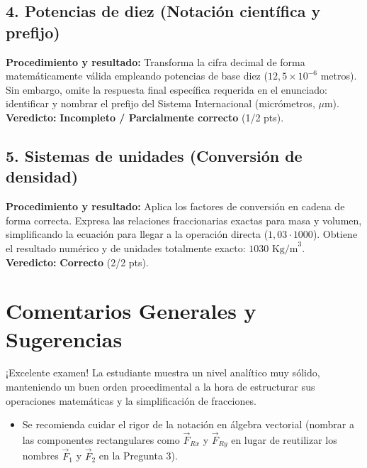 \documentclass[12pt]{article}
\begin{document}
\subsection*{4. Potencias de diez (Notación científica y prefijo)}
\textbf{Procedimiento y resultado:} Transforma la cifra decimal de forma matemáticamente válida empleando potencias de base diez ($12,5 \times 10^{-6}$ metros). Sin embargo, omite la respuesta final específica requerida en el enunciado: identificar y nombrar el prefijo del Sistema Internacional (micrómetros, $\mu$m). \\
\textbf{Veredicto:} \textbf{Incompleto / Parcialmente correcto} (1/2 pts).

\subsection*{5. Sistemas de unidades (Conversión de densidad)}
\textbf{Procedimiento y resultado:} Aplica los factores de conversión en cadena de forma correcta. Expresa las relaciones fraccionarias exactas para masa y volumen, simplificando la ecuación para llegar a la operación directa ($1,03 \cdot 1000$). Obtiene el resultado numérico y de unidades totalmente exacto: $1030 \text{ Kg/m}^3$. \\
\textbf{Veredicto:} \textbf{Correcto} (2/2 pts).

\vspace{0.5cm}
\section*{Comentarios Generales y Sugerencias}
¡Excelente examen! La estudiante muestra un nivel analítico muy sólido, manteniendo un buen orden procedimental a la hora de estructurar sus operaciones matemáticas y la simplificación de fracciones.
\begin{itemize}
    \item Se recomienda cuidar el rigor de la notación en álgebra vectorial (nombrar a las componentes rectangulares como $\vec{F}_{Rx}$ y $\vec{F}_{Ry}$ en lugar de reutilizar los nombres $\vec{F}_1$ y $\vec{F}_2$ en la Pregunta 3).
\end{itemize}
\end{document}
